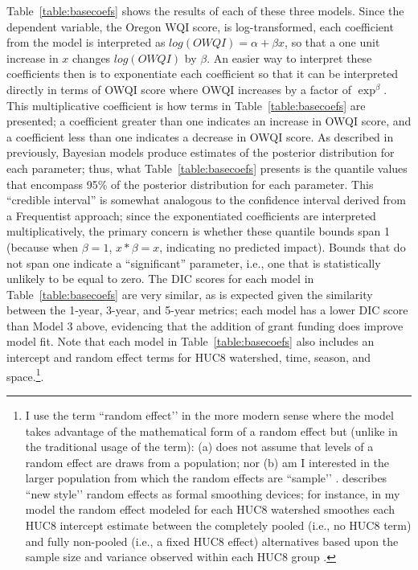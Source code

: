 \documentclass[12pt,a4paper,titlepage]{article}
\begin{document}
Table~\ref{table:basecoefs} shows the results of each of these three models. Since the dependent variable, the Oregon WQI score, is log-transformed, each coefficient from the model is interpreted as $log(OWQI) =\alpha+\beta x$, so that a one unit increase in $x$ changes $log(OWQI)$ by $\beta$. An easier way to interpret these coefficients then is to exponentiate each coefficient so that it can be interpreted directly in terms of OWQI score where OWQI increases by a factor of $\exp^{\beta}$. This multiplicative coefficient is how terms in Table~\ref{table:basecoefs} are presented; a coefficient greater than one indicates an increase in OWQI score, and a coefficient less than one indicates a decrease in OWQI score. As described in previously, Bayesian models produce estimates of the posterior distribution for each parameter; thus, what Table~\ref{table:basecoefs} presents is the quantile values that encompass 95\% of the posterior distribution for each parameter. This “credible interval” \parencite{gelman2013} is somewhat analogous to the confidence interval derived from a Frequentist approach; since the exponentiated coefficients are interpreted multiplicatively, the primary concern is whether these quantile bounds span 1 (because when $\beta=1$, $x*\beta=x$, indicating no predicted impact). Bounds that do not span one indicate a “significant” parameter, i.e., one that is statistically unlikely to be equal to zero. The DIC scores for each model in Table~\ref{table:basecoefs} are very similar, as is expected given the similarity between the 1-year, 3-year, and 5-year metrics; each model has a lower DIC score than Model 3 above, evidencing that the addition of grant funding does improve model fit. Note that each model in Table~\ref{table:basecoefs} also includes an intercept and random effect terms for HUC8 watershed, time, season, and space.\footnote{I use the term ``random effect’’ in the more modern sense where the model takes advantage of the mathematical form of a random effect but (unlike in the traditional usage of the term): (a) does not assume that levels of a random effect are draws from a population; nor (b) am I interested in the larger population from which the random effects are ``sample’’ \parencite[see][]{hodges2014}. \textcite{hodges2014} describes ``new style’’ random effects as formal smoothing devices; for instance, in my model the random effect modeled for each HUC8 watershed smoothes each HUC8 intercept estimate between the completely pooled (i.e., no HUC8 term) and fully non-pooled (i.e., a fixed HUC8 effect) alternatives based upon the sample size and variance observed within each HUC8 group \parencite[see][]{gelman2007}.}. 
\end{document}
